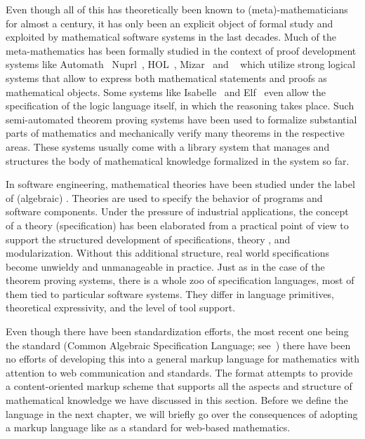 Even though all of this has theoretically been known to (meta)-mathema\-ticians for
almost a century, it has only been an explicit object of formal study and
exploited by mathematical software systems in the last decades. Much of the
meta-mathematics has been formally studied in the context of proof development
systems like  {\sc Automath}~\cite{Bruijn80}
Nuprl~\cite{Constable86}, HOL~\cite{GoMe93}, {\sc Mizar}~\cite{Rudnicki:aomp92}
and {\OMEGA}~\cite{BenzmuellerEtAl:otama97} which utilize strong logical systems
that allow to express both mathematical statements and proofs as mathematical
objects.  Some systems like Isabelle~\cite{Paulson90} and Elf~\cite{Pfenning91}
even allow the specification of the logic language itself, in which the reasoning
takes place. Such semi-automated theorem proving systems have been used to
formalize substantial parts of mathematics and mechanically verify many theorems
in the respective areas. These systems usually come with a library system that
manages and structures the body of mathematical knowledge formalized in the system
so far.

In software engineering, mathematical theories have been studied under the label
of (algebraic) {}. Theories
are used to specify the behavior of programs and software components. Under the
pressure of industrial applications, the concept of a theory (specification) has
been elaborated from a practical point of view to support the structured
development of specifications, theory {}, and
modularization. Without this additional structure, real world specifications
become unwieldy and unmanageable in practice. Just as in the case of the theorem
proving systems, there is a whole zoo of specification languages, most of them
tied to particular software systems.  They differ in language primitives,
theoretical expressivity, and the level of tool support.

Even though there have been standardization efforts, the most recent one being the
{\casl} standard (Common Algebraic Specification Language; see~\cite{CoFI98})
there have been no efforts of developing this into a general markup language for
mathematics with attention to web communication and standards. The {\omdoc} format
attempts to provide a content-oriented markup scheme that supports all the aspects
and structure of mathematical knowledge we have discussed in this section. Before
we define the language in the next chapter, we will briefly go over the
consequences of adopting a markup language like {\omdoc} as a standard for
web-based mathematics.

